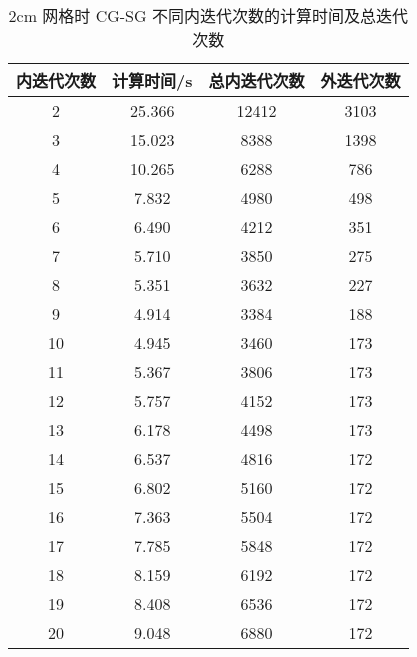 \begin{datasheet}
\begin{table}
\centering
\caption{2cm 网格时 CG-SG 不同内迭代次数的计算时间及总迭代次数}
\label{tab:equsolve.iter.cg-sg.2cm}
\begin{tabular}{cccc}
\toprule
内迭代次数 & 计算时间/s & 总内迭代次数 & 外迭代次数\\
\midrule
2 & 25.366 & 12412 & 3103\\
3 & 15.023 & 8388 & 1398\\
4 & 10.265 & 6288 & 786\\
5 & 7.832 & 4980 & 498\\
6 & 6.490 & 4212 & 351\\
7 & 5.710 & 3850 & 275\\
8 & 5.351 & 3632 & 227\\
9 & 4.914 & 3384 & 188\\
10 & 4.945 & 3460 & 173\\
11 & 5.367 & 3806 & 173\\
12 & 5.757 & 4152 & 173\\
13 & 6.178 & 4498 & 173\\
14 & 6.537 & 4816 & 172\\
15 & 6.802 & 5160 & 172\\
16 & 7.363 & 5504 & 172\\
17 & 7.785 & 5848 & 172\\
18 & 8.159 & 6192 & 172\\
19 & 8.408 & 6536 & 172\\
20 & 9.048 & 6880 & 172\\
\bottomrule
\end{tabular}
\end{table}



\end{datasheet}
